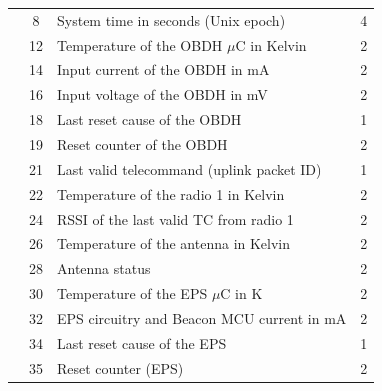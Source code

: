 \begin{longtable}[c]{lcL{0.4\textwidth}c}
                                         & 8                 & System time in seconds (Unix epoch)                  & 4                       \\
	                                     & 12                & Temperature of the OBDH $\mu$C in Kelvin             & 2                       \\
	                                     & 14                & Input current of the OBDH in mA                      & 2                       \\
	                                     & 16                & Input voltage of the OBDH in mV                      & 2                       \\
	                                     & 18                & Last reset cause of the OBDH                         & 1                       \\
	                                     & 19                & Reset counter of the OBDH                            & 2                       \\
	                                     & 21                & Last valid telecommand (uplink packet ID)            & 1                       \\
	                                     & 22                & Temperature of the radio 1 in Kelvin                 & 2                       \\
	                                     & 24                & RSSI of the last valid TC from radio 1               & 2                       \\
	                                     & 26                & Temperature of the antenna in Kelvin                 & 2                       \\
	                                     & 28                & Antenna status                                       & 2                       \\
	                                     & 30                & Temperature of the EPS $\mu$C in K                   & 2                       \\
	                                     & 32                & EPS circuitry and Beacon MCU current in mA           & 2                       \\
	                                     & 34                & Last reset cause of the EPS                          & 1                       \\
	                                     & 35                & Reset counter (EPS)                                  & 2                       \\

\end{longtable}

